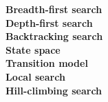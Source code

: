 


\textbf{Breadth-first search\index{}} \\

\textbf{Depth-first search\index{}} \\

\textbf{Backtracking search\index{}} \\

\textbf{State space\index{}} \\

\textbf{Transition model\index{}} \\

\textbf{Local search\index{}} \\

\textbf{Hill-climbing search\index{}}
